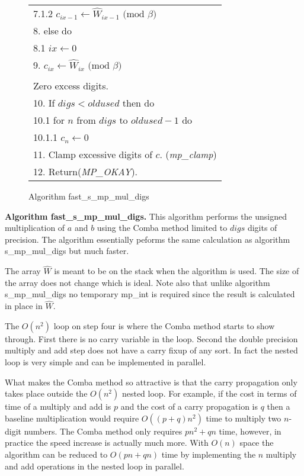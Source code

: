 \documentclass[b5paper]{book}
\begin{document}
\begin{figure}[!here]
\begin{small}
\begin{center}
\begin{tabular}{l}
\hspace{6mm}7.1.2  $c_{ix - 1} \leftarrow \hat W_{ix - 1} \mbox{ (mod }\beta\mbox{)}$ \\
8.  else do \\
\hspace{3mm}8.1  $ix \leftarrow 0$ \\
9.  $c_{ix} \leftarrow \hat W_{ix} \mbox{ (mod }\beta\mbox{)}$ \\
\\
Zero excess digits. \\
10.  If $digs < oldused$ then do \\
\hspace{3mm}10.1  for $n$ from $digs$ to $oldused - 1$ do \\
\hspace{6mm}10.1.1  $c_n \leftarrow 0$ \\
11.  Clamp excessive digits of $c$.  (\textit{mp\_clamp}) \\
12.  Return(\textit{MP\_OKAY}). \\
\hline
\end{tabular}
\end{center}
\end{small}
\caption{Algorithm fast\_s\_mp\_mul\_digs}
\end{figure}

\textbf{Algorithm fast\_s\_mp\_mul\_digs.}
This algorithm performs the unsigned multiplication of $a$ and $b$ using the Comba method limited to $digs$ digits of precision.  The algorithm
essentially peforms the same calculation as algorithm s\_mp\_mul\_digs but much faster.

The array $\hat W$ is meant to be on the stack when the algorithm is used.  The size of the array does not change which is ideal.  Note also that 
unlike algorithm s\_mp\_mul\_digs no temporary mp\_int is required since the result is calculated in place in $\hat W$.  

The $O(n^2)$ loop on step four is where the Comba method starts to show through.  First there is no carry variable in the loop.  Second the
double precision multiply and add step does not have a carry fixup of any sort.  In fact the nested loop is very simple and can be implemented
in parallel.  

What makes the Comba method so attractive is that the carry propagation only takes place outside the $O(n^2)$ nested loop.  For example, if the 
cost in terms of time of a multiply and add is $p$ and the cost of a carry propagation is $q$ then a baseline multiplication would require 
$O \left ((p + q)n^2 \right )$ time to multiply two $n$-digit numbers.  The Comba method only requires $pn^2 + qn$ time, however, in practice 
the speed increase is actually much more.  With $O(n)$ space the algorithm can be reduced to $O(pn + qn)$ time by implementing the $n$ multiply
and add operations in the nested loop in parallel.  
\end{document}
